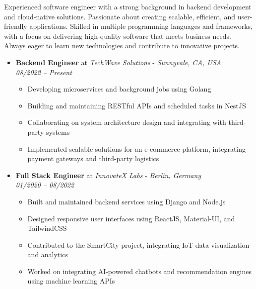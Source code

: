 \documentclass[a4paper,10pt]{article}
\begin{document}
    \vspace{1em}
    Experienced software engineer with a strong background in backend development and cloud-native solutions. Passionate about creating scalable, efficient, and user-friendly applications. Skilled in multiple programming languages and frameworks, with a focus on delivering high-quality software that meets business needs. Always eager to learn new technologies and contribute to innovative projects.

    \vspace{2em}
    \begin{itemize}
        \item \textbf{Backend Engineer} at \textit{TechWave Solutions} - \emph{\small Sunnyvale, CA, USA}\\
        \emph{\small 08/2022 -- Present}
        \begin{itemize}
            \item Developing microservices and background jobs using Golang
            \item Building and maintaining RESTful APIs and scheduled tasks in NestJS
            \item Collaborating on system architecture design and integrating with third-party systems
            \item Implemented scalable solutions for an e-commerce platform, integrating payment gateways and third-party logistics
        \end{itemize}
        \item \textbf{Full Stack Engineer} at \textit{InnovateX Labs} - \emph{\small Berlin, Germany}\\
        \emph{\small 01/2020 -- 08/2022}
        \begin{itemize}
            \item Built and maintained backend services using Django and Node.js
            \item Designed responsive user interfaces using ReactJS, Material-UI, and TailwindCSS
            \item Contributed to the SmartCity project, integrating IoT data visualization and analytics
            \item Worked on integrating AI-powered chatbots and recommendation engines using machine learning APIs
        \end{itemize}
    \end{itemize}

    \vspace{2em}
    \vspace{1em}
                     
\end{document}
